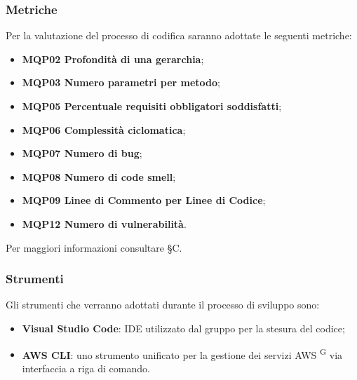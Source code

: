 \subsubsection{Metriche}
Per la valutazione del processo di codifica saranno adottate le seguenti metriche:
\begin{itemize}
\item \textbf{MQP02 Profondità di una gerarchia};
\item \textbf{MQP03 Numero parametri per metodo};
\item \textbf{MQP05 Percentuale requisiti obbligatori soddisfatti};
\item \textbf{MQP06 Complessità ciclomatica};
\item \textbf{MQP07 Numero di bug};
\item \textbf{MQP08 Numero di code smell};
\item \textbf{MQP09 Linee di Commento per Linee di Codice};
\item \textbf{MQP12 Numero di vulnerabilità}.
\end{itemize}
Per maggiori informazioni consultare \S{}C.

\subsubsection{Strumenti}
Gli strumenti che verranno adottati durante il processo di sviluppo sono:
\begin{itemize}
\item \textbf{Visual Studio Code}: IDE utilizzato dal gruppo per la stesura del codice;
\item \textbf{AWS CLI}: uno strumento unificato per la gestione dei servizi AWS \textsuperscript{G} via interfaccia a riga di comando.
\end{itemize}
